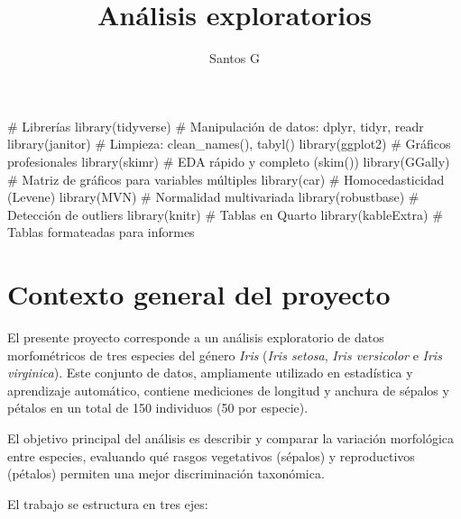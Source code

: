 \documentclass[
  spanish,
  11pt,
  a4paper,
  DIV=11,
  numbers=noendperiod]{scrartcl}
\title{Análisis exploratorios}
\author{Santos G}
\date{}
\newenvironment{Shaded}{\begin{snugshade}}{\end{snugshade}}
\newcommand{\CommentTok}[1]{\textcolor[rgb]{0.37,0.37,0.37}{#1}}
\newcommand{\FunctionTok}[1]{\textcolor[rgb]{0.28,0.35,0.67}{#1}}
\newcommand{\NormalTok}[1]{\textcolor[rgb]{0.00,0.23,0.31}{#1}}
\renewcommand*\contentsname{Tabla de contenidos}
\newcommand\contentsname{Tabla de contenidos}
\begin{document}
\maketitle

\renewcommand*\contentsname{Tabla de contenidos}
{
\hypersetup{linkcolor=}
\setcounter{tocdepth}{2}
\tableofcontents
}

\begin{Shaded}
\begin{Highlighting}[numbers=left,,]
\CommentTok{\# Librerías }
\FunctionTok{library}\NormalTok{(tidyverse)   }\CommentTok{\# Manipulación de datos: dplyr, tidyr, readr}
\FunctionTok{library}\NormalTok{(janitor)     }\CommentTok{\# Limpieza: clean\_names(), tabyl()}
\FunctionTok{library}\NormalTok{(ggplot2)     }\CommentTok{\# Gráficos profesionales}
\FunctionTok{library}\NormalTok{(skimr)       }\CommentTok{\# EDA rápido y completo (skim())}
\FunctionTok{library}\NormalTok{(GGally)      }\CommentTok{\# Matriz de gráficos para variables múltiples}
\FunctionTok{library}\NormalTok{(car)         }\CommentTok{\# Homocedasticidad (Levene)}
\FunctionTok{library}\NormalTok{(MVN)         }\CommentTok{\# Normalidad multivariada }
\FunctionTok{library}\NormalTok{(robustbase)  }\CommentTok{\# Detección de outliers}
\FunctionTok{library}\NormalTok{(knitr)       }\CommentTok{\# Tablas en Quarto}
\FunctionTok{library}\NormalTok{(kableExtra)  }\CommentTok{\# Tablas formateadas para informes}
\end{Highlighting}
\end{Shaded}

\section{Contexto general del
proyecto}\label{contexto-general-del-proyecto}

El presente proyecto corresponde a un análisis exploratorio de datos
morfométricos de tres especies del género \emph{Iris} (\emph{Iris
setosa}, \emph{Iris versicolor} e \emph{Iris virginica}). Este conjunto
de datos, ampliamente utilizado en estadística y aprendizaje automático,
contiene mediciones de longitud y anchura de sépalos y pétalos en un
total de 150 individuos (50 por especie).

El objetivo principal del análisis es describir y comparar la variación
morfológica entre especies, evaluando qué rasgos vegetativos (sépalos) y
reproductivos (pétalos) permiten una mejor discriminación taxonómica.

El trabajo se estructura en tres ejes:
\end{document}
